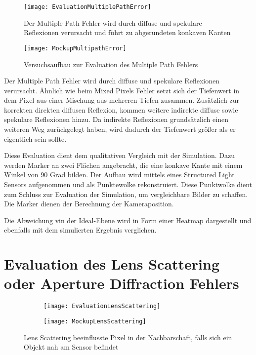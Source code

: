 \documentclass[thesis.tex]{subfiles}
\begin{document}
\begin{figure}[ht]
\centering
  \texttt{[image: EvaluationMultiplePathError]}
  \label{fig:EvaluationMultiplePathError}
  \caption{Der Multiple Path Fehler wird durch diffuse und spekulare Reflexionen verursacht und führt zu abgerundeten konkaven Kanten}
\end{figure}

\begin{figure}[ht]
\centering
  \texttt{[image: MockupMultipathError]}
  \label{fig:MockupMultipathError}
  \caption{Versuchsaufbau zur Evaluation des Multiple Path Fehlers}
\end{figure}

Der Multiple Path Fehler wird durch diffuse und spekulare Reflexionen verursacht. Ähnlich wie beim Mixed Pixels Fehler setzt sich der Tiefenwert in dem Pixel aus einer Mischung aus mehreren Tiefen zusammen. Zusätzlich zur korrekten direkten diffusen Reflexion, kommen weitere indirekte diffuse sowie spekulare Reflexionen hinzu. Da indirekte Reflexionen grundsätzlich einen weiteren Weg zurückgelegt haben, wird dadurch der Tiefenwert größer als er eigentlich sein sollte. 

Diese Evaluation dient dem qualitativen Vergleich mit der Simulation. Dazu werden Marker an zwei Flächen angebracht, die eine konkave Kante mit einem Winkel von 90 Grad bilden. Der Aufbau wird mittels eines Structured Light Sensors aufgenommen und als Punktewolke rekonstruiert. Diese Punktwolke dient zum Schluss zur Evaluation der Simulation, um vergleichbare Bilder zu schaffen. Die Marker dienen der Berechnung der Kameraposition.

Die Abweichung vin der Ideal-Ebene wird in Form einer Heatmap dargestellt und ebenfalls mit dem simulierten Ergebnis verglichen.

\newpage

\section{Evaluation des Lens Scattering oder Aperture Diffraction  Fehlers}

\begin{figure}[h]
\centering
\begin{subfigure}{.5\textwidth}
  \centering
  \texttt{[image: EvaluationLensScattering]}
\end{subfigure}%
\begin{subfigure}{.5\textwidth}
  \centering
  \texttt{[image: MockupLensScattering]}
\end{subfigure}
\caption{Lens Scattering beeinflusste Pixel in der Nachbarschaft, falls sich ein Objekt nah am Sensor befindet}
\end{figure}
\end{document}
